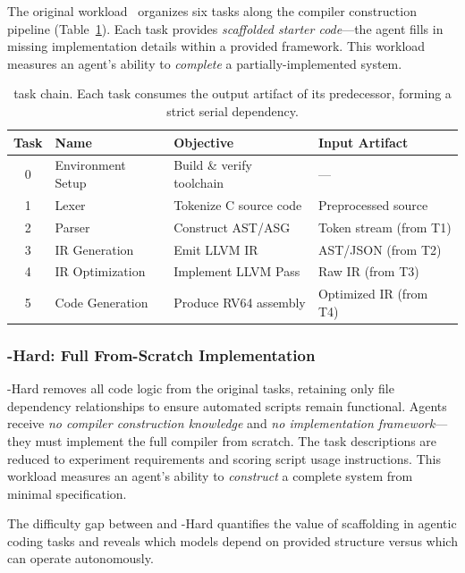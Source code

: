 The original \yatcc{} workload~\cite{yatcc2024} organizes six tasks along the compiler construction pipeline (Table~\ref{tab:tasks}).
Each task provides \emph{scaffolded starter code}---the agent fills in missing implementation details within a provided framework.
This workload measures an agent's ability to \emph{complete} a partially-implemented system.

\begin{table}[!t]
\centering
\small
\begin{tabular}{clll}
\toprule
\textbf{Task} & \textbf{Name} & \textbf{Objective} & \textbf{Input Artifact} \\
\midrule
0 & Environment Setup & Build \& verify toolchain & --- \\
1 & Lexer & Tokenize C source code & Preprocessed source \\
2 & Parser & Construct AST/ASG & Token stream (from T1) \\
3 & IR Generation & Emit LLVM IR & AST/JSON (from T2) \\
4 & IR Optimization & Implement LLVM Pass & Raw IR (from T3) \\
5 & Code Generation & Produce RV64 assembly & Optimized IR (from T4) \\
\bottomrule
\end{tabular}
\caption{\eva{} task chain. Each task consumes the output artifact of its predecessor, forming a strict serial dependency.}
\label{tab:tasks}
\end{table}

\subsubsection{\yatcc{}-Hard: Full From-Scratch Implementation}

\yatcc{}-Hard removes all code logic from the original tasks, retaining only file dependency relationships to ensure automated scripts remain functional.
Agents receive \emph{no compiler construction knowledge} and \emph{no implementation framework}---they must implement the full compiler from scratch.
The task descriptions are reduced to experiment requirements and scoring script usage instructions.
This workload measures an agent's ability to \emph{construct} a complete system from minimal specification.

The difficulty gap between \yatcc{} and \yatcc{}-Hard quantifies the value of scaffolding in agentic coding tasks and reveals which models depend on provided structure versus which can operate autonomously.

